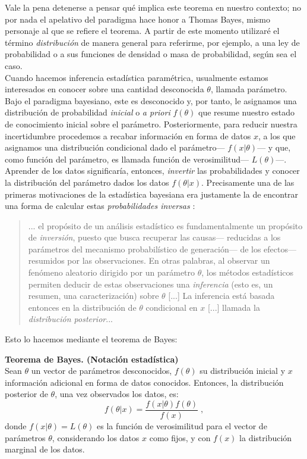 Vale la pena detenerse a pensar qué implica este teorema en nuestro contexto; no por nada el apelativo del paradigma hace honor a Thomas Bayes, mismo personaje al que se refiere el teorema. A partir de este momento utilizaré el término \textit{distribución} de manera general para referirme, por ejemplo, a una ley de probabilidad o a sus funciones de densidad o masa de probabilidad, según sea el caso.\\ 

Cuando hacemos inferencia estadística paramétrica, usualmente estamos interesados en conocer sobre una cantidad desconocida $\theta$, llamada parámetro. Bajo el paradigma bayesiano, este es desconocido y, por tanto, le asignamos una  distribución de probabilidad \textit{inicial} o \textit{a priori} $f(\theta)$ que resume nuestro estado de conocimiento inicial sobre el parámetro. Posteriormente, para reducir nuestra incertidumbre procedemos a recabar información en forma de datos $x$, a los que asignamos una distribución condicional dado el parámetro--- $f(x|\theta)$--- y que, como función del parámetro, es llamada función de verosimilitud--- $L(\theta)$---.\\ 

Aprender de los datos significaría, entonces, \textit{invertir} las probabilidades y conocer la distribución del parámetro dados los datos $f(\theta|x)$. Precisamente una de las primeras motivaciones de la estadística bayesiana era justamente la de encontrar una forma de calcular estas \textit{probabilidades inversas} \citep{Robert07}: 
\begin{quote}
... el propósito de un análisis estadístico es fundamentalmente un propósito de \textit{inversión}, puesto que busca recuperar las causas--- reducidas a los parámetros del mecanismo probabilístico de generación--- de los efectos--- resumidos por las observaciones. En otras palabras, al observar un fenómeno aleatorio dirigido por un parámetro $\theta$, los métodos estadísticos permiten deducir de estas observaciones una \textit{inferencia} (esto es, un resumen, una caracterización) sobre $\theta$ [...] La inferencia está basada entonces en la distribución de $\theta$ condicional en $x$ [...] llamada la \textit{distribución posterior}...
\end{quote} 

Esto lo hacemos mediante el teorema de Bayes: 

\begin{teo} \label{teo:Bayes_2}
\textbf{Teorema de Bayes. (Notación estadística)}\\
Sean $\theta$ un vector de parámetros desconocidos, $f(\theta)$ su distribución inicial y $x$ información adicional en forma de datos conocidos. Entonces, la distribución posterior de $\theta$, una vez observados los datos, es: 
\begin{equation*}
f(\theta|x)=\dfrac{f(x|\theta)f(\theta)}{f(x)}\;,
\end{equation*}
donde $f(x|\theta) = L(\theta)$ es la función de verosimilitud para el vector de parámetros $\theta$, considerando los datos $x$ como fijos, y con $f(x)$ la distribución marginal de los datos. 
\end{teo}

